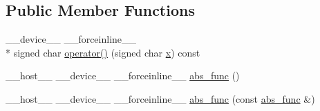 \subsection*{Public Member Functions}
\begin{DoxyCompactItemize}
\item 
\-\_\-\-\_\-device\-\_\-\-\_\- \-\_\-\-\_\-forceinline\-\_\-\-\_\- \\*
signed char \hyperlink{structcv_1_1gpu_1_1device_1_1abs__func_3_01signed_01char_01_4_ad06552fcbfeccb405c49d524e7c48d17}{operator()} (signed char \hyperlink{highgui__c_8h_a6150e0515f7202e2fb518f7206ed97dc}{x}) const 
\item 
\-\_\-\-\_\-host\-\_\-\-\_\- \-\_\-\-\_\-device\-\_\-\-\_\- \-\_\-\-\_\-forceinline\-\_\-\-\_\- \hyperlink{structcv_1_1gpu_1_1device_1_1abs__func_3_01signed_01char_01_4_aa1216378cd7636d237d12ab500b6e506}{abs\-\_\-func} ()
\item 
\-\_\-\-\_\-host\-\_\-\-\_\- \-\_\-\-\_\-device\-\_\-\-\_\- \-\_\-\-\_\-forceinline\-\_\-\-\_\- \hyperlink{structcv_1_1gpu_1_1device_1_1abs__func_3_01signed_01char_01_4_a9cfbff272fd4283b90b4eec3761f2dde}{abs\-\_\-func} (const \hyperlink{structcv_1_1gpu_1_1device_1_1abs__func}{abs\-\_\-func} \&)
\end{DoxyCompactItemize}


